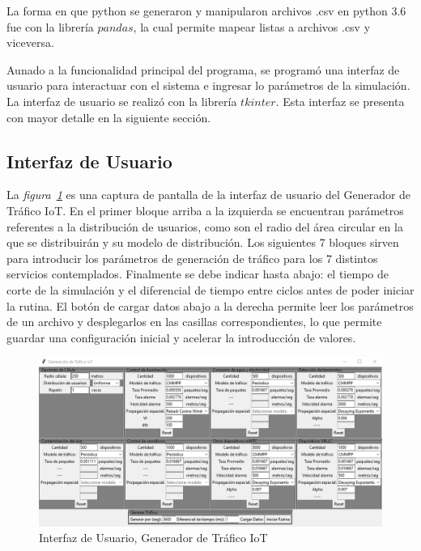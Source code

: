     La forma en que python se generaron y manipularon archivos .csv en python 3.6 fue con la librería $pandas$, la cual permite mapear listas a archivos .csv y viceversa. \newline

    Aunado a la funcionalidad principal del programa, se programó una interfaz de usuario para interactuar con el sistema e ingresar lo parámetros de la simulación. La interfaz de usuario se realizó con la librería $tkinter$. Esta interfaz se presenta con mayor detalle en la siguiente sección. \newline


\subsection{Interfaz de Usuario}

    La \textit{figura~\ref{fig:GUITrafico}} es una captura de pantalla de la interfaz de usuario del Generador de Tráfico IoT. En el primer bloque arriba a la izquierda se encuentran parámetros referentes a la distribución de usuarios, como son el radio del área circular en la que se distribuirán y su modelo de distribución. Los siguientes 7 bloques sirven para introducir los parámetros de generación de tráfico para los 7 distintos servicios contemplados. Finalmente se debe indicar hasta abajo: el tiempo de corte de la simulación y el diferencial de tiempo entre ciclos antes de poder iniciar la rutina. El botón de cargar datos abajo a la derecha permite leer los parámetros de un archivo y desplegarlos en las casillas correspondientes, lo que permite guardar una configuración inicial y acelerar la introducción de valores. \newline

    
\begin{figure}[th]
    \centering
    \includegraphics[scale=.65]{Figures/GUI.png}
    \decoRule
    \caption[Interfaz de Usuario, Generador de Tráfico IoT]{Interfaz de Usuario, Generador de Tráfico IoT}
    \label{fig:GUITrafico}
\end{figure}

